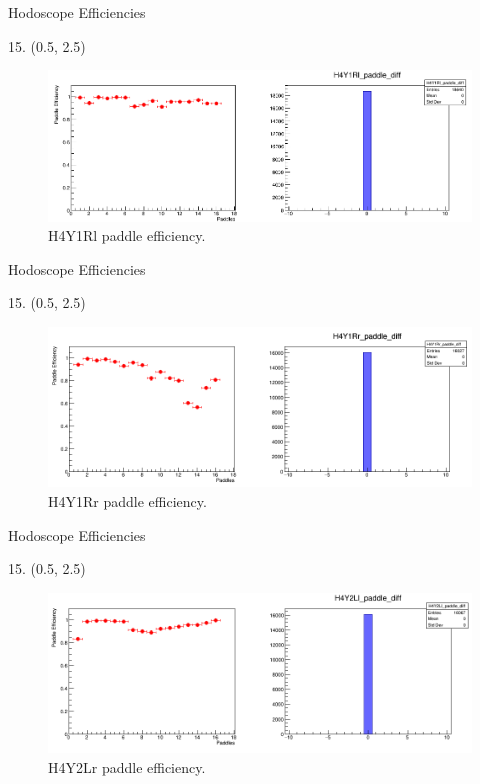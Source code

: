 \documentclass[12pt, xcolor={dvipsnames}, aspectratio = 169, sans,mathserif]{beamer}
\newenvironment{Pic}[2]
{
\begin{textblock}{#1} #2
\begin{figure}
}
{
\end{figure}
\end{textblock}
}
\begin{document}
\begin{frame}{Hodoscope Efficiencies}
\begin{Pic}{15.}{(0.5, 2.5)}
  \includegraphics[width=15.0cm]{imgs/H4Y1Rl_paddle_diff.png}
  \caption{H4Y1Rl paddle efficiency.}
\end{Pic}
\end{frame}

\begin{frame}{Hodoscope Efficiencies}
\begin{Pic}{15.}{(0.5, 2.5)}
  \includegraphics[width=15.0cm]{imgs/H4Y1Rr_paddle_diff.png}
  \caption{H4Y1Rr paddle efficiency.}
\end{Pic}
\end{frame}

\begin{frame}{Hodoscope Efficiencies}
\begin{Pic}{15.}{(0.5, 2.5)}
  \includegraphics[width=15.0cm]{imgs/H4Y2Lr_paddle_diff.png}
  \caption{H4Y2Lr paddle efficiency.}
\end{Pic}
\end{frame}
\end{document}
